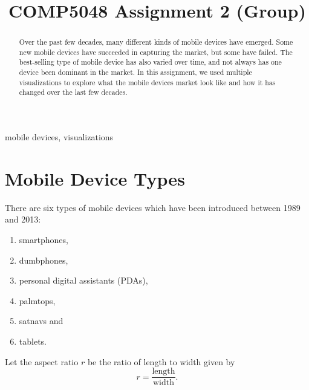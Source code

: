 \documentclass[conference]{IEEEtran}
\begin{document}
\title{COMP5048 Assignment 2 (Group)}

\author{
\and
{}
\and
{}
\and
{}
\and
{}
}

\maketitle

\begin{abstract}
Over the past few decades, many different kinds of mobile devices have emerged. Some new mobile devices have succeeded in capturing the market, but some have failed. The best-selling type of mobile device has also varied over time, and not always has one device been dominant in the market. In this assignment, we used multiple visualizations to explore what the mobile devices market look like and how it has changed over the last few decades.
\end{abstract}

\begin{IEEEkeywords}
mobile devices, visualizations
\end{IEEEkeywords}

\section{Mobile Device Types}

There are six types of mobile devices which have been introduced between 1989
and 2013:
\begin{enumerate}
	\item smartphones,
	\item dumbphones,
	\item personal digital assistants (PDAs),
	\item palmtops,
	\item satnavs and
	\item tablets.
\end{enumerate}

Let the aspect ratio $r$ be the ratio of length to width given by
\[ r = \frac{\text{length}}{\text{width}}. \]
\end{document}
